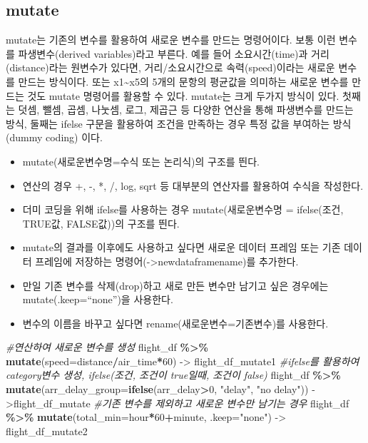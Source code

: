 \documentclass[
]{book}
\newenvironment{Shaded}{\begin{snugshade}}{\end{snugshade}}
\newcommand{\AttributeTok}[1]{\textcolor[rgb]{0.13,0.29,0.53}{#1}}
\newcommand{\CommentTok}[1]{\textcolor[rgb]{0.56,0.35,0.01}{\textit{#1}}}
\newcommand{\DecValTok}[1]{\textcolor[rgb]{0.00,0.00,0.81}{#1}}
\newcommand{\FunctionTok}[1]{\textcolor[rgb]{0.13,0.29,0.53}{\textbf{#1}}}
\newcommand{\NormalTok}[1]{#1}
\newcommand{\OtherTok}[1]{\textcolor[rgb]{0.56,0.35,0.01}{#1}}
\newcommand{\SpecialCharTok}[1]{\textcolor[rgb]{0.81,0.36,0.00}{\textbf{#1}}}
\newcommand{\StringTok}[1]{\textcolor[rgb]{0.31,0.60,0.02}{#1}}
\providecommand{\tightlist}{%
  \setlength{\itemsep}{0pt}\setlength{\parskip}{0pt}}
\begin{document}
\subsection{mutate}\label{mutate}

mutate는 기존의 변수를 활용하여 새로운 변수를 만드는 명령어이다. 보통 이런 변수를 파생변수(derived variables)라고 부른다. 예를 들어 소요시간(time)과 거리(distance)라는 원변수가 있다면, 거리/소요시간으로 속력(speed)이라는 새로운 변수를 만드는 방식이다. 또는 x1\textasciitilde x5의 5개의 문항의 평균값을 의미하는 새로운 변수를 만드는 것도 mutate 명령어를 활용할 수 있다. mutate는 크게 두가지 방식이 있다. 첫째는 덧셈, 뺄셈, 곱셈, 나눗셈, 로그, 제곱근 등 다양한 연산을 통해 파생변수를 만드는 방식, 둘째는 ifelse 구문을 활용하여 조건을 만족하는 경우 특정 값을 부여하는 방식(dummy coding) 이다.

\begin{itemize}
\tightlist
\item
  mutate(새로운변수명=수식 또는 논리식)의 구조를 띈다.
\item
  연산의 경우 +, -, *, /, log, sqrt 등 대부분의 연산자를 활용하여 수식을 작성한다.
\item
  더미 코딩을 위해 ifelse를 사용하는 경우 mutate(새로운변수명 = ifelse(조건, TRUE값, FALSE값))의 구조를 띈다.
\item
  mutate의 결과를 이후에도 사용하고 싶다면 새로운 데이터 프레임 또는 기존 데이터 프레임에 저장하는 명령어(-\textgreater newdataframename)를 추가한다.
\item
  만일 기존 변수를 삭제(drop)하고 새로 만든 변수만 남기고 싶은 경우에는 mutate(.keep=``none'')을 사용한다.
\item
  변수의 이름을 바꾸고 싶다면 rename(새로운변수=기존변수)를 사용한다.
\end{itemize}

\begin{Shaded}
\begin{Highlighting}[]
\CommentTok{\#연산하여 새로운 변수를 생성}
\NormalTok{flight\_df }\SpecialCharTok{\%\textgreater{}\%}
  \FunctionTok{mutate}\NormalTok{(}\AttributeTok{speed=}\NormalTok{distance}\SpecialCharTok{/}\NormalTok{air\_time}\SpecialCharTok{*}\DecValTok{60}\NormalTok{) }\OtherTok{{-}\textgreater{}}\NormalTok{ flight\_df\_mutate1}
\CommentTok{\#ifelse를 활용하여 category변수 생성, ifelse(조건, 조건이 true일때, 조건이 false)}
\NormalTok{flight\_df }\SpecialCharTok{\%\textgreater{}\%}
  \FunctionTok{mutate}\NormalTok{(}\AttributeTok{arr\_delay\_group=}\FunctionTok{ifelse}\NormalTok{(arr\_delay}\SpecialCharTok{\textgreater{}}\DecValTok{0}\NormalTok{, }\StringTok{"delay"}\NormalTok{, }\StringTok{"no delay"}\NormalTok{)) }\OtherTok{{-}\textgreater{}}\NormalTok{flight\_df\_mutate}
\CommentTok{\#기존 변수를 제외하고 새로운 변수만 남기는 경우}
\NormalTok{flight\_df }\SpecialCharTok{\%\textgreater{}\%} 
  \FunctionTok{mutate}\NormalTok{(}\AttributeTok{total\_min=}\NormalTok{hour}\SpecialCharTok{*}\DecValTok{60}\SpecialCharTok{+}\NormalTok{minute, }\AttributeTok{.keep=}\StringTok{"none"}\NormalTok{) }\OtherTok{{-}\textgreater{}}\NormalTok{ flight\_df\_mutate2}
\end{Highlighting}
\end{Shaded}
\end{document}
